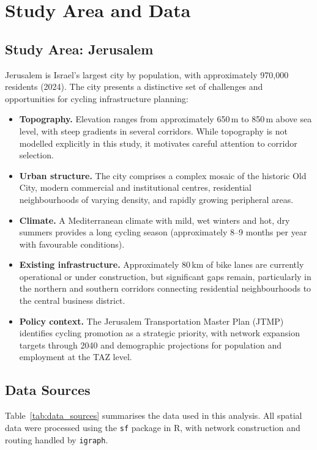 \documentclass[12pt,a4paper]{article}
\begin{document}
\section{Study Area and Data}
\label{sec:data}

\subsection{Study Area: Jerusalem}

Jerusalem is Israel's largest city by population, with approximately 970{,}000 residents (2024). The city presents a distinctive set of challenges and opportunities for cycling infrastructure planning:

\begin{itemize}[leftmargin=*]
    \item \textbf{Topography.} Elevation ranges from approximately 650\,m to 850\,m above sea level, with steep gradients in several corridors. While topography is not modelled explicitly in this study, it motivates careful attention to corridor selection.
    \item \textbf{Urban structure.} The city comprises a complex mosaic of the historic Old City, modern commercial and institutional centres, residential neighbourhoods of varying density, and rapidly growing peripheral areas.
    \item \textbf{Climate.} A Mediterranean climate with mild, wet winters and hot, dry summers provides a long cycling season (approximately 8--9 months per year with favourable conditions).
    \item \textbf{Existing infrastructure.} Approximately 80\,km of bike lanes are currently operational or under construction, but significant gaps remain, particularly in the northern and southern corridors connecting residential neighbourhoods to the central business district.
    \item \textbf{Policy context.} The Jerusalem Transportation Master Plan (JTMP) identifies cycling promotion as a strategic priority, with network expansion targets through 2040 and demographic projections for population and employment at the TAZ level.
\end{itemize}

\subsection{Data Sources}

Table~\ref{tab:data_sources} summarises the data used in this analysis. All spatial data were processed using the \texttt{sf} package in R, with network construction and routing handled by \texttt{igraph}.
\end{document}
